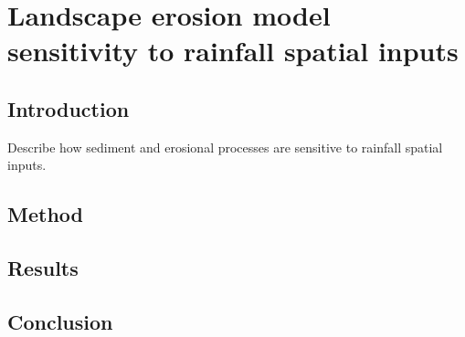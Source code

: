 \chapter{Landscape erosion model sensitivity to rainfall spatial inputs}

\section{Introduction}

Describe how sediment and erosional processes are sensitive to rainfall spatial inputs.

\section{Method}

\section{Results}

\section{Conclusion}










